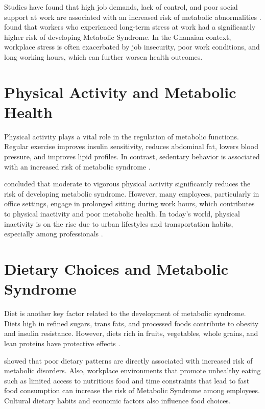 \par Studies have found that high job demands, lack of control, and poor social support at work are associated with an increased risk of metabolic abnormalities \citep{griep2015job}. \cite{chandola2006work} found that workers who experienced long-term stress at work had a significantly higher risk of developing Metabolic Syndrome. In the Ghanaian context, workplace stress is often exacerbated by job insecurity, poor work conditions, and long working hours, which can further worsen health outcomes.

\section{Physical Activity and Metabolic Health}

Physical activity plays a vital role in the regulation of metabolic functions. Regular exercise improves insulin sensitivity, reduces abdominal fat, lowers blood pressure, and improves lipid profiles. In contrast, sedentary behavior is associated with an increased risk of metabolic syndrome \citep{seo2023leisure}.

\par \cite{warburton2006health} concluded that moderate to vigorous physical activity significantly reduces the risk of developing metabolic syndrome. However, many employees, particularly in office settings, engage in prolonged sitting during work hours, which contributes to physical inactivity and poor metabolic health. In today's world, physical inactivity is on the rise due to urban lifestyles and transportation habits, especially among professionals \citep{hettiarachchi2021physical}.

\section{Dietary Choices and Metabolic Syndrome}

Diet is another key factor related to the development of metabolic syndrome. Diets high in refined sugars, trans fats, and processed foods contribute to obesity and insulin resistance. However, diets rich in fruits, vegetables, whole grains, and lean proteins have protective effects \citep{siqueira2024major}.


\par \cite{hu2002diet} showed that poor dietary patterns are directly associated with increased risk of metabolic disorders. Also, workplace environments that promote unhealthy eating such as limited access to nutritious food and time constraints that lead to fast food consumption can increase the risk of Metabolic Syndrome among employees. Cultural dietary habits and economic factors also influence food choices.


